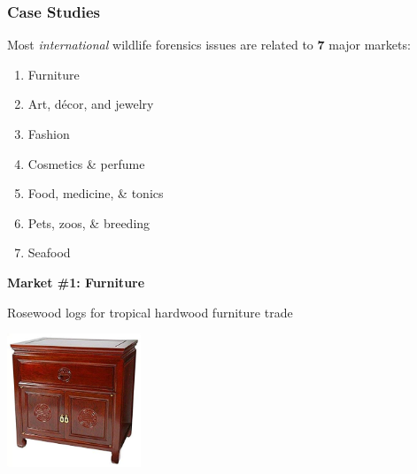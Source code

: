 \documentclass[10pt]{beamer}
\begin{document}
\begin{frame}[t]
\frametitle{Case Studies}
\vspace{0.5cm}

	Most \emph{international} wildlife forensics issues are related to \textbf{7} major markets:\\
	
		\begin{enumerate}
			\item Furniture
			\smallskip
			\item Art, d\'{e}cor, and jewelry
			\smallskip
			\item Fashion
			\smallskip
			\item Cosmetics \& perfume
			\smallskip
			\item Food, medicine, \& tonics
			\smallskip 
			\item Pets, zoos, \& breeding
			\smallskip
			\item Seafood
		\end{enumerate}
	
	
\end{frame}


\begin{frame}
	\begin{center}
		\Large{\textbf{\textcolor{myblue}{Market \#1: Furniture}}}\\ \normalsize{}
		
		\vspace{0.25cm}
		
		Rosewood logs for tropical hardwood furniture trade\\
		
		\vspace{1.0cm}
		
		\includegraphics[width=0.3\textwidth]{figures/rosewood.jpg}
		
	\end{center}
\end{frame}
\end{document}

